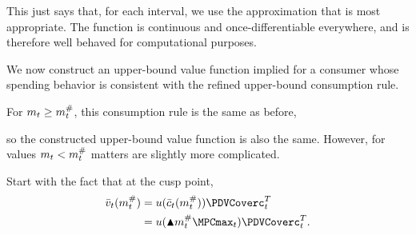 This just says that, for each interval, we use the approximation that
is most appropriate.  The function is continuous and
once-differentiable everywhere, and is therefore well behaved for
computational purposes.


We now construct an upper-bound value function implied for a consumer whose spending behavior is consistent with the refined upper-bound consumption rule.

For $m_{t} \geq m_{t}^{\#}$, this consumption rule is the same as before,

  so the constructed upper-bound value function is also the same.  However, for
  values $m_{t} < m_{t}^{\#}$ matters are slightly more complicated.

  Start with the fact that at the cusp point,
  \begin{equation*}\begin{gathered}\begin{aligned}
        \bar{\vFunc}_{\prd}(\mtCusp)  & = \uFunc(\bar{\cNrm}_{\prd}(\mtCusp))\PDVCoverc_{\prd}^T \\
        & =  \uFunc(\aboveMin \mtCusp  \MPCmax_{\prd})\PDVCoverc_{\prd}^{T}
        .
      \end{aligned}\end{gathered}\end{equation*}

